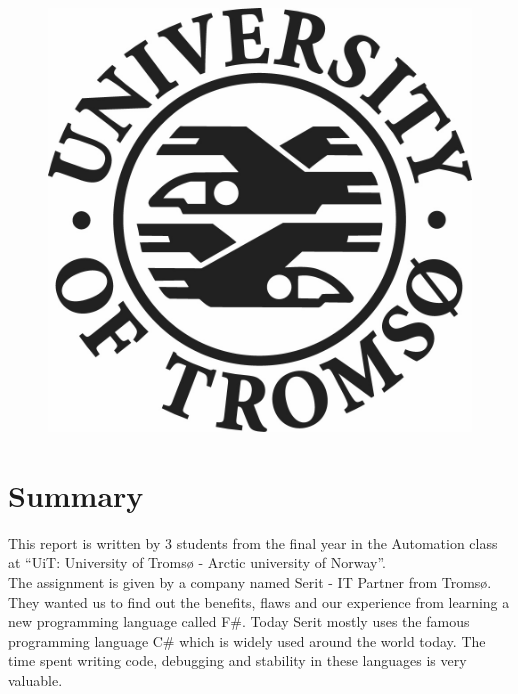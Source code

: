 \documentclass[12pt, a4paper]{article}
\begin{document}
\begin{titlepage}
\begin{figure}[!h]
\begin{minipage}[b]{0.3\textwidth}
  \end{minipage}
  \hfill
  \begin{minipage}[b]{0.3\textwidth}
    \includegraphics[width=\textwidth]{LogoEngelsk}
  \end{minipage}
\end{figure}


\end{titlepage}

\newpage



\newpage
\section*{Summary}
This report is written by 3 students from the final year in the Automation class at “UiT: University of Tromsø - Arctic university of Norway”.\\

The assignment is given by a company named Serit - IT Partner from Tromsø. They wanted us to find out the benefits, flaws and our experience from learning a new programming language called F\#. Today Serit mostly uses the famous programming language C\# which is widely used around the world today. The time spent writing code, debugging and stability in these languages is very valuable.
\end{document}
